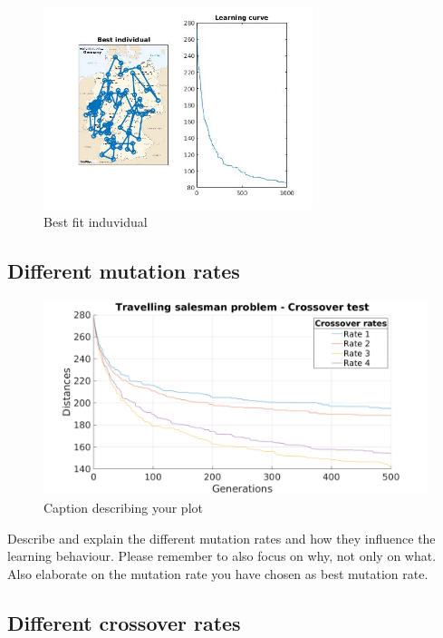 \documentclass[a4paper, 12pt]{article}
\begin{document}
\begin{figure}[ht!]
  \centering
  \includegraphics[width=0.7\textwidth]{images/Bestfit}
    \caption{Best fit induvidual \label{fig:xxx1}}
\end{figure}

\newpage
\subsection{Different mutation rates}

\begin{figure}[ht!]
	\centering
	\includegraphics[width=1.0\textwidth]{images/crossfig}
	\caption{Caption describing your plot \label{fig:crossfig}}
\end{figure}

Describe and explain the different mutation rates and how they influence the learning behaviour. Please remember to also focus on why, not only on what.
Also elaborate on the mutation rate you have chosen as best mutation rate.

\newpage

\subsection{Different crossover rates}
\end{document}
